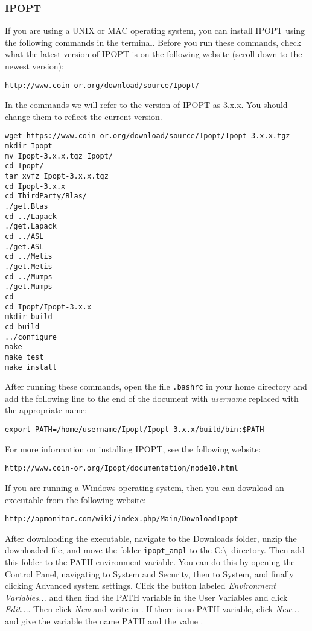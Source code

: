 \subsubsection{IPOPT}
If you are using a UNIX or MAC operating system, you can install IPOPT using the following commands in the terminal. Before you run these commands, check what the latest version of IPOPT is on the following website (scroll down to the newest version):
\begin{verbatim}
http://www.coin-or.org/download/source/Ipopt/
\end{verbatim}
In the commands we will refer to the version of IPOPT as 3.x.x. You should change them to reflect the current version.
\begin{framed}
\begin{verbatim}
wget https://www.coin-or.org/download/source/Ipopt/Ipopt-3.x.x.tgz
mkdir Ipopt 
mv Ipopt-3.x.x.tgz Ipopt/
cd Ipopt/
tar xvfz Ipopt-3.x.x.tgz
cd Ipopt-3.x.x
cd ThirdParty/Blas/
./get.Blas
cd ../Lapack
./get.Lapack
cd ../ASL
./get.ASL
cd ../Metis
./get.Metis
cd ../Mumps
./get.Mumps
cd
cd Ipopt/Ipopt-3.x.x
mkdir build
cd build
../configure
make
make test
make install
\end{verbatim}
\end{framed}
After running these commands, open the file \texttt{.bashrc} in your home directory and add the following line to the end of the document with {\it username} replaced with the appropriate name:
\begin{verbatim}
export PATH=/home/username/Ipopt/Ipopt-3.x.x/build/bin:$PATH
\end{verbatim}
For more information on installing IPOPT, see the following website:
\begin{verbatim}
http://www.coin-or.org/Ipopt/documentation/node10.html
\end{verbatim}
If you are running a Windows operating system, then you can download an executable from the following website:
\begin{verbatim}
http://apmonitor.com/wiki/index.php/Main/DownloadIpopt
\end{verbatim}
After downloading the executable, navigate to the Downloads folder, unzip the downloaded file, and move the folder \texttt{ipopt\_ampl} to the C:\textbackslash\ directory. Then add this folder to the PATH environment variable. You can do this by opening the Control Panel, navigating to System and Security, then to System, and finally clicking Advanced system settings. Click the button labeled \emph{Environment Variables...} and then find the PATH variable in the User Variables and click \emph{Edit...}. Then click {\it New} and write in . If there is no PATH variable, click \emph{New...} and give the variable the name PATH  and the value .